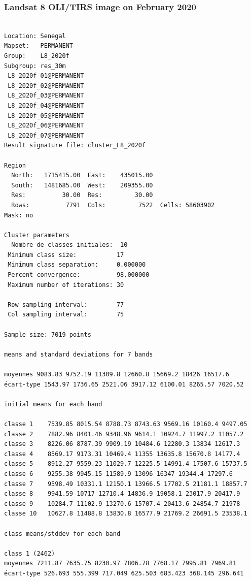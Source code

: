 \documentclass[land,article,submit,pdftex,moreauthors]{Definitions/mdpi}
\begin{document}
\subsubsection[\appendixname~\thesubsubsection]{Landsat 8 OLI/TIRS image on February 2020}
\begin{scriptsize}
\begin{verbatim}

Location: Senegal
Mapset:   PERMANENT
Group:    L8_2020f
Subgroup: res_30m
 L8_2020f_01@PERMANENT
 L8_2020f_02@PERMANENT
 L8_2020f_03@PERMANENT
 L8_2020f_04@PERMANENT
 L8_2020f_05@PERMANENT
 L8_2020f_06@PERMANENT
 L8_2020f_07@PERMANENT
Result signature file: cluster_L8_2020f

Region
  North:   1715415.00  East:    435015.00
  South:   1481685.00  West:    209355.00
  Res:          30.00  Res:         30.00
  Rows:          7791  Cols:         7522  Cells: 58603902
Mask: no

Cluster parameters
  Nombre de classes initiales: 	10
 Minimum class size:           17
 Minimum class separation:     0.000000
 Percent convergence:          98.000000
 Maximum number of iterations: 30

 Row sampling interval:        77
 Col sampling interval:        75

Sample size: 7019 points

means and standard deviations for 7 bands

moyennes 9083.83 9752.19 11309.8 12660.8 15669.2 18426 16517.6
écart-type 1543.97 1736.65 2521.06 3917.12 6100.01 8265.57 7020.52

initial means for each band

classe 1    7539.85 8015.54 8788.73 8743.63 9569.16 10160.4 9497.05
classe 2    7882.96 8401.46 9348.96 9614.1 10924.7 11997.2 11057.2
classe 3    8226.06 8787.39 9909.19 10484.6 12280.3 13834 12617.3
classe 4    8569.17 9173.31 10469.4 11355 13635.8 15670.8 14177.4
classe 5    8912.27 9559.23 11029.7 12225.5 14991.4 17507.6 15737.5
classe 6    9255.38 9945.15 11589.9 13096 16347 19344.4 17297.6
classe 7    9598.49 10331.1 12150.1 13966.5 17702.5 21181.1 18857.7
classe 8    9941.59 10717 12710.4 14836.9 19058.1 23017.9 20417.9
classe 9    10284.7 11102.9 13270.6 15707.4 20413.6 24854.7 21978
classe 10   10627.8 11488.8 13830.8 16577.9 21769.2 26691.5 23538.1

class means/stddev for each band

class 1 (2462)
moyennes 7211.87 7635.75 8230.97 7806.78 7768.17 7995.81 7969.81
écart-type 526.693 555.399 717.049 625.503 683.423 368.145 296.641


\end{verbatim}
\end{scriptsize}
\end{document}
